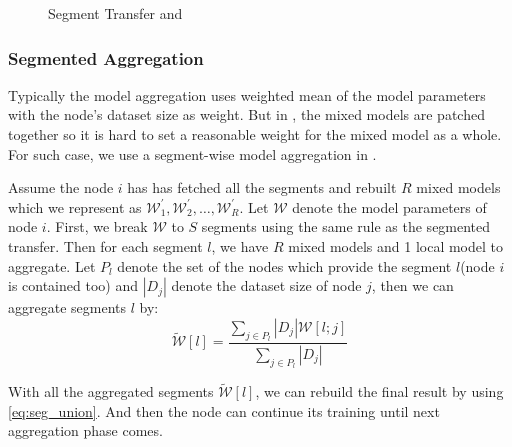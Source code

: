  \begin{figure}[H]
\centering 
{}
\caption{Segment Transfer and }
\label{Fig: Segment}
\end{figure}

\subsubsection{Segmented Aggregation}
Typically the model aggregation uses weighted mean of the model parameters with the node's dataset size as weight. But in \sys, the mixed models are patched together so it is hard to set a reasonable weight for the mixed model as a whole. For such case, we use a segment-wise model aggregation in \sys.

 Assume the node $i$ has has fetched all the segments and rebuilt $R$ mixed models which we represent as $\mathcal{W}^\prime_1,\mathcal{W}^\prime_2, \dots ,\mathcal{W}^\prime_R$. Let $\mathcal{W}$ denote the model parameters of node $i$. First, we break $\mathcal{W}$ to $S$ segments using the same rule as the segmented transfer. Then for each segment $l$, we have $R$ mixed models and 1 local model to aggregate. Let $P_l$ denote the set of the nodes which provide the segment $l$(node $i$ is contained too) and $|D_j|$ denote the dataset size of node $j$, then we can aggregate segments $l$ by:
 \begin{equation}
     \widetilde{\mathcal{W}}[l] = \frac{\sum_{j\in P_l}|D_j|\mathcal{W}[l;j]}{\sum_{j\in P_l}|D_j|}
 \end{equation}

With all the aggregated segments $\widetilde{\mathcal{W}}[l]$, we can rebuild the final result by using \eqref{eq:seg_union}. And then the node can continue its training until next aggregation phase comes.

